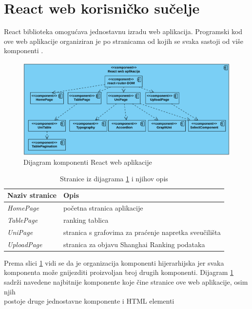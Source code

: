 \documentclass[times, utf8, zavrsni]{fer}
\begin{document}
\section{React web korisničko sučelje}
React biblioteka omogućava jednostavnu izradu web aplikacija. Programski kod ove web aplikacije organiziran je po stranicama  od kojih se svaka 
sastoji od više komponenti .
\begin{figure}[htb]
    \hspace{-1.5cm}
       \includegraphics[scale=0.27]{reactkomponente.png} 
       \caption{Dijagram komponenti React web aplikacije}
       \label{fig:reactkomponente}
       \end{figure}
       \begin{table}[htb]
        \caption{Stranice iz dijagrama \ref{fig:reactkomponente} i njihov opis}
            \label{tbl:stranice}
            \centering
            \begin{tabular}{ll} \hline
            Naziv stranice & Opis\\ \hline
            \emph{HomePage} & početna stranica aplikacije\\
            \emph{TablePage} & ranking tablica\\
            \emph{UniPage} & stranica s grafovima za praćenje napretka sveučilišta\\
            \emph{UploadPage} & stranica za objavu Shanghai Ranking podataka
            \end{tabular} 
            \end{table} 
            \FloatBarrier
Prema slici \ref{fig:reactkomponente} vidi se da je organizacija komponenti hijerarhijska jer svaka \\komponenta može gnijezditi proizvoljan broj drugih komponenti.
Dijagram \ref{fig:reactkomponente} sadrži navedene najbitnije komponente koje čine stranice ove web aplikacije, osim njih \\postoje druge jednostavne komponente i HTML elementi 
\end{document}
